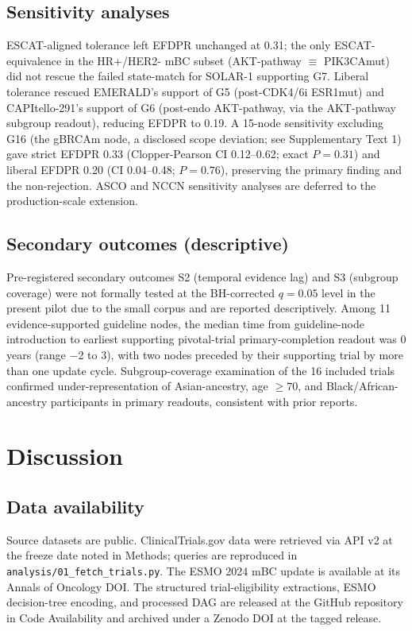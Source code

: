 \documentclass[11pt,a4paper]{article}
\begin{document}
\subsection{Sensitivity analyses}
ESCAT-aligned tolerance left EFDPR unchanged at 0.31; the only ESCAT-equivalence in the HR+/HER2- mBC subset (AKT-pathway $\equiv$ PIK3CAmut) did not rescue the failed state-match for SOLAR-1 supporting G7. Liberal tolerance rescued EMERALD's support of G5 (post-CDK4/6i ESR1mut) and CAPItello-291's support of G6 (post-endo AKT-pathway, via the AKT-pathway subgroup readout), reducing EFDPR to 0.19. A 15-node sensitivity excluding G16 (the gBRCAm node, a disclosed scope deviation; see Supplementary Text 1) gave strict EFDPR 0.33 (Clopper-Pearson CI 0.12--0.62; exact $P = 0.31$) and liberal EFDPR 0.20 (CI 0.04--0.48; $P = 0.76$), preserving the primary finding and the non-rejection. ASCO and NCCN sensitivity analyses are deferred to the production-scale extension.

\subsection{Secondary outcomes (descriptive)}
Pre-registered secondary outcomes S2 (temporal evidence lag) and S3 (subgroup coverage) were not formally tested at the BH-corrected $q=0.05$ level in the present pilot due to the small corpus and are reported descriptively. Among 11 evidence-supported guideline nodes, the median time from guideline-node introduction to earliest supporting pivotal-trial primary-completion readout was 0 years (range $-$2 to 3), with two nodes preceded by their supporting trial by more than one update cycle. Subgroup-coverage examination of the 16 included trials confirmed under-representation of Asian-ancestry, age $\geq 70$, and Black/African-ancestry participants in primary readouts, consistent with prior reports.\citep{niranjan2020representation}

\section{Discussion}\label{sec:discussion}


\subsection*{Data availability}
Source datasets are public. ClinicalTrials.gov data were retrieved via API v2 at the freeze date noted in Methods; queries are reproduced in \texttt{analysis/01\_fetch\_trials.py}. The ESMO 2024 mBC update is available at its Annals of Oncology DOI. The structured trial-eligibility extractions, ESMO decision-tree encoding, and processed DAG are released at the GitHub repository in Code Availability and archived under a Zenodo DOI at the tagged release.
\end{document}
